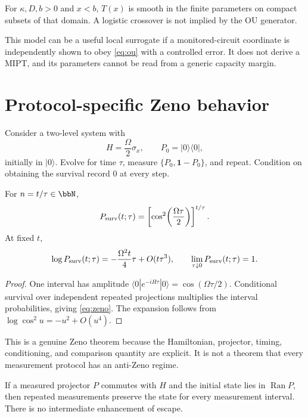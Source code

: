 \documentclass[11pt]{article}
\newcommand{\id}{\mathbf 1}
\begin{document}
\begin{corollary}\label{cor:smooth}
For $\kappa,D,b>0$ and $x<b$, $T(x)$ is smooth in the finite parameters
on compact subsets of that domain.  A logistic crossover is not implied
by the OU generator.
\end{corollary}

This model can be a useful local surrogate if a monitored-circuit
coordinate is independently shown to obey \cref{eq:ou} with a controlled
error.  It does not derive a MIPT, and its parameters cannot be read from
a generic capacity margin.

\section{Protocol-specific Zeno behavior}

Consider a two-level system with
\[
 H=\frac{\Omega}{2}\sigma_x,\qquad
 P_0=|0\rangle\langle0|,
\]
initially in $|0\rangle$.  Evolve for time $\tau$, measure
$\{P_0,\id-P_0\}$, and repeat.  Condition on obtaining the survival
record $0$ at every step.

\begin{theorem}\label{thm:zeno}
For $n=t/\tau\in\bbN$,
\begin{equation}\label{eq:zeno}
 P_{\rm surv}(t;\tau)
 =
 \left[\cos^2\!\left(\frac{\Omega\tau}{2}\right)\right]^{t/\tau}.
\end{equation}
At fixed $t$,
\[
 \log P_{\rm surv}(t;\tau)
 =-\frac{\Omega^2t}{4}\tau+O(t\tau^3),
 \qquad
 \lim_{\tau\downarrow0}P_{\rm surv}(t;\tau)=1 .
\]
\end{theorem}

\begin{proof}
One interval has amplitude
$\langle0|e^{-iH\tau}|0\rangle=\cos(\Omega\tau/2)$.
Conditional survival over independent repeated projections multiplies
the interval probabilities, giving \cref{eq:zeno}.  The expansion follows
from $\log\cos^2 u=-u^2+O(u^4)$.
\end{proof}

This is a genuine Zeno theorem because the Hamiltonian, projector,
timing, conditioning, and comparison quantity are explicit.  It is not a
theorem that every measurement protocol has an anti-Zeno regime.

\begin{proposition}
\label{prop:anti}
If a measured projector $P$ commutes with $H$ and the initial state lies
in $\operatorname{Ran}P$, then repeated measurements preserve the state
for every measurement interval.  There is no intermediate enhancement
of escape.
\end{proposition}
\end{document}

